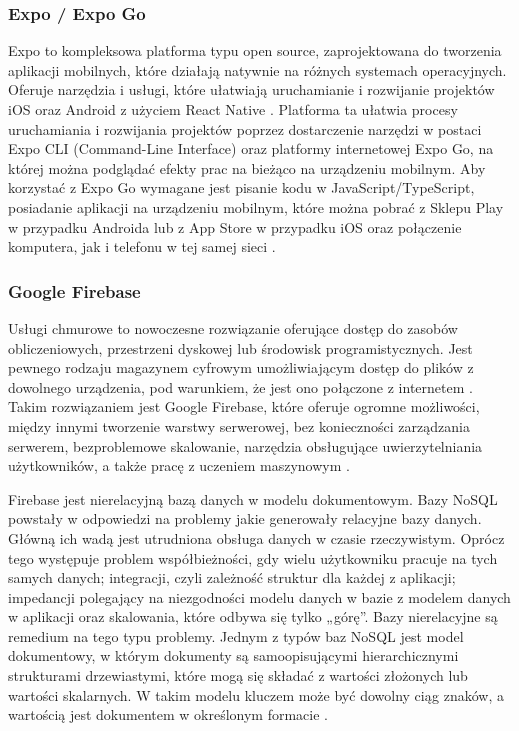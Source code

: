 \subsubsection*{\textbf{Expo / Expo Go}}
Expo to kompleksowa platforma typu open source, zaprojektowana do tworzenia aplikacji mobilnych, które działają natywnie na różnych systemach operacyjnych. Oferuje narzędzia i usługi, które ułatwiają uruchamianie i rozwijanie projektów iOS oraz Android z użyciem React Native \cite{javascripteverywhere}. Platforma ta ułatwia procesy uruchamiania i rozwijania projektów poprzez dostarczenie narzędzi w postaci Expo CLI (Command-Line Interface) oraz platformy internetowej Expo Go, na której można podglądać efekty prac na bieżąco na urządzeniu mobilnym. Aby korzystać z Expo Go wymagane jest pisanie kodu w JavaScript/TypeScript, posiadanie aplikacji na urządzeniu mobilnym, które można pobrać z Sklepu Play w przypadku Androida lub z App Store w przypadku iOS oraz połączenie komputera, jak i telefonu w tej samej sieci \cite{expogo}.

\subsubsection*{\textbf{Google Firebase}}
Usługi chmurowe to nowoczesne rozwiązanie oferujące dostęp do zasobów obliczeniowych, przestrzeni dyskowej lub środowisk programistycznych. Jest pewnego rodzaju magazynem cyfrowym umożliwiającym dostęp do plików z dowolnego urządzenia, pod warunkiem, że jest ono połączone z internetem \cite{cloud}. Takim rozwiązaniem jest Google Firebase, które oferuje ogromne możliwości, między innymi tworzenie warstwy serwerowej, bez konieczności zarządzania serwerem, bezproblemowe skalowanie, narzędzia obsługujące uwierzytelniania użytkowników, a także pracę z uczeniem maszynowym \cite{firebase}.

Firebase jest nierelacyjną bazą danych w modelu dokumentowym. Bazy NoSQL powstały w odpowiedzi na problemy jakie generowały relacyjne bazy danych. Główną ich wadą jest utrudniona obsługa danych w czasie rzeczywistym. Oprócz tego występuje problem współbieżności, gdy wielu użytkowniku pracuje na tych samych danych; integracji, czyli zależność struktur dla każdej z aplikacji; impedancji polegający na niezgodności modelu danych w bazie z modelem danych w aplikacji oraz skalowania, które odbywa się tylko „górę”. Bazy nierelacyjne są remedium na tego typu problemy. Jednym z typów baz NoSQL jest model dokumentowy, w którym dokumenty są samoopisującymi hierarchicznymi strukturami drzewiastymi, które mogą się składać z wartości złożonych lub wartości skalarnych. W takim modelu kluczem może być dowolny ciąg znaków, a wartością jest dokumentem w określonym formacie \cite{nosql}.

